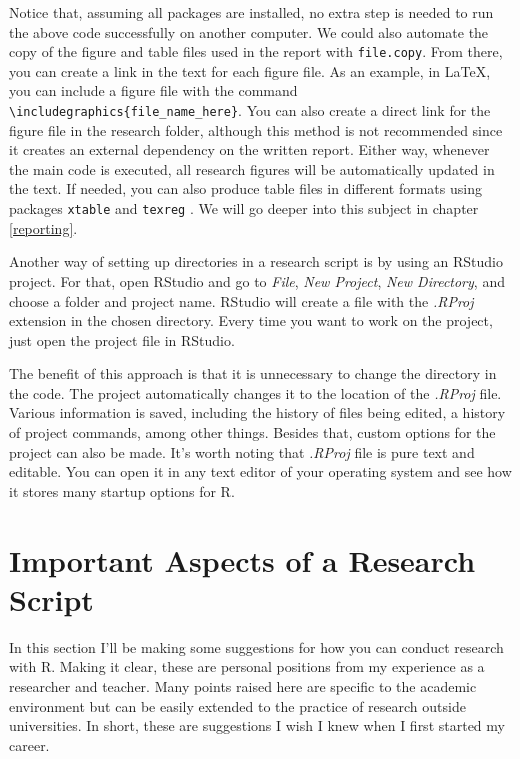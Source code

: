 \documentclass[
  12pt,
]{book}
\begin{document}
Notice that, assuming all packages are installed, no extra step is needed to run the above code successfully on another computer. We could also automate the copy of the figure and table files used in the report with \texttt{file.copy}. From there, you can create a link in the text for each figure file. As an example, in LaTeX, you can include a figure file with the command \texttt{\textbackslash{}includegraphics\{file\_name\_here\}}. You can also create a direct link for the figure file in the research folder, although this method is not recommended since it creates an external dependency on the written report. Either way, whenever the main code is executed, all research figures will be automatically updated in the text. If needed, you can also produce table files in different formats using packages \texttt{xtable} \citep{R-xtable} and \texttt{texreg} \citep{R-texreg}. We will go deeper into this subject in chapter \ref{reporting}.

Another way of setting up directories in a research script is by using an RStudio project. For that, open RStudio and go to \emph{File}, \emph{New Project}, \emph{New Directory}, and choose a folder and project name. RStudio will create a file with the \emph{.RProj} extension in the chosen directory. Every time you want to work on the project, just open the project file in RStudio.

The benefit of this approach is that it is unnecessary to change the directory in the code. The project automatically changes it to the location of the \emph{.RProj} file. Various information is saved, including the history of files being edited, a history of project commands, among other things. Besides that, custom options for the project can also be made. It's worth noting that \emph{.RProj} file is pure text and editable. You can open it in any text editor of your operating system and see how it stores many startup options for R.

\hypertarget{important-aspects-of-a-research-script}{%
\section{Important Aspects of a Research Script}\label{important-aspects-of-a-research-script}}

In this section I'll be making some suggestions for how you can conduct research with R. Making it clear, these are personal positions from my experience as a researcher and teacher. Many points raised here are specific to the academic environment but can be easily extended to the practice of research outside universities. In short, these are suggestions I wish I knew when I first started my career.
\end{document}
